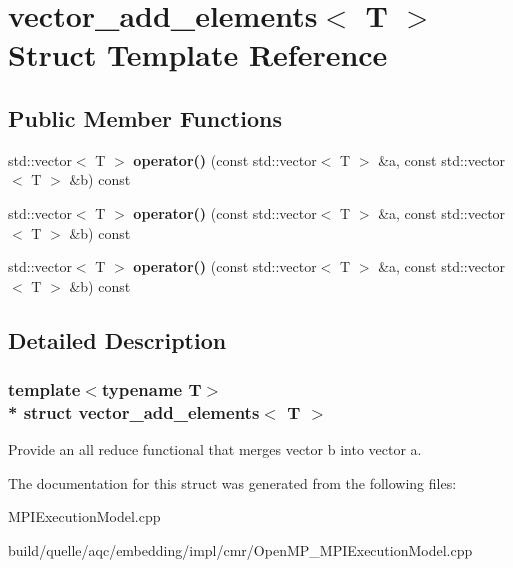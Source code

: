 \hypertarget{a00128}{}\section{vector\+\_\+add\+\_\+elements$<$ T $>$ Struct Template Reference}
\label{a00128}
\subsection*{Public Member Functions}
\begin{DoxyCompactItemize}
\item 
std\+::vector$<$ T $>$ {\bfseries operator()} (const std\+::vector$<$ T $>$ \&a, const std\+::vector$<$ T $>$ \&b) const \hypertarget{a00128_ac23491b25efc57a4abc9831263f8dd1b}{}\label{a00128_ac23491b25efc57a4abc9831263f8dd1b}

\item 
std\+::vector$<$ T $>$ {\bfseries operator()} (const std\+::vector$<$ T $>$ \&a, const std\+::vector$<$ T $>$ \&b) const \hypertarget{a00128_ac23491b25efc57a4abc9831263f8dd1b}{}\label{a00128_ac23491b25efc57a4abc9831263f8dd1b}

\item 
std\+::vector$<$ T $>$ {\bfseries operator()} (const std\+::vector$<$ T $>$ \&a, const std\+::vector$<$ T $>$ \&b) const \hypertarget{a00128_ac23491b25efc57a4abc9831263f8dd1b}{}\label{a00128_ac23491b25efc57a4abc9831263f8dd1b}

\end{DoxyCompactItemize}


\subsection{Detailed Description}
\subsubsection*{template$<$typename T$>$\\*
struct vector\+\_\+add\+\_\+elements$<$ T $>$}

Provide an all reduce functional that merges vector b into vector a. 

The documentation for this struct was generated from the following files\+:\begin{DoxyCompactItemize}
\item 
M\+P\+I\+Execution\+Model.\+cpp\item 
build/quelle/aqc/embedding/impl/cmr/\+Open\+M\+P\+\_\+\+M\+P\+I\+Execution\+Model.\+cpp\end{DoxyCompactItemize}
